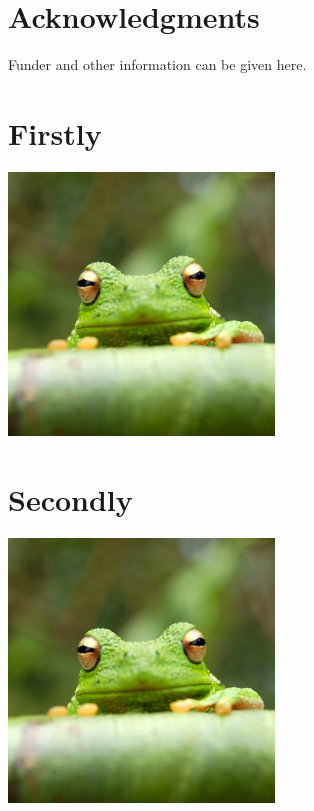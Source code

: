 \documentclass[9pt]{livecoms}
\begin{document}
\section{Acknowledgments}

Funder and other information can be given here.

\nocite{*} %



\appendix
\begin{appendixbox}
\label{first:app}
\section{Firstly}
\lipsum[1]

\begin{center}
\includegraphics[width=\linewidth,height=7cm]{frog}
\end{center}

\section{Secondly}

\lipsum[5-8]

\begin{center}
\includegraphics[width=\linewidth,height=7cm]{frog}
\end{center}

\end{appendixbox}
\end{document}
